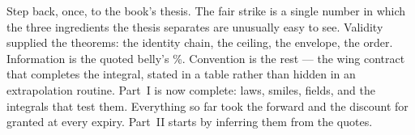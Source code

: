 Step back, once, to the book's thesis.  The fair strike is a single
number in which the three ingredients the thesis separates are
unusually easy to see.  Validity supplied the theorems: the identity
chain, the ceiling, the envelope, the order.  Information is the
quoted belly's \MacVsShareQuotedPct\%.  Convention is the rest ---
the wing contract that completes the integral, stated in a table
rather than hidden in an extrapolation routine.  Part~I is now
complete: laws, smiles, fields, and the integrals that test them.
Everything so far took the forward and the discount for granted at
every expiry.  Part~II starts by inferring them from the quotes.
